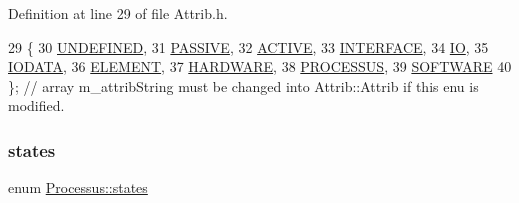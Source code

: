 Definition at line 29 of file Attrib.\+h.


\begin{DoxyCode}
29                 \{
30     \hyperlink{classAttrib_a69e171d7cc6417835a5a306d3c764235a3a8da2ab97dda18aebab196fe4100531}{UNDEFINED},
31     \hyperlink{classAttrib_a69e171d7cc6417835a5a306d3c764235a2bfb2af57b87031d190a05fe25dd92ed}{PASSIVE},
32     \hyperlink{classAttrib_a69e171d7cc6417835a5a306d3c764235a3b1fec929c0370d1436f2f06e298fb0d}{ACTIVE},
33     \hyperlink{classAttrib_a69e171d7cc6417835a5a306d3c764235aa27c16b480a369ea4d18b07b2516bbc7}{INTERFACE},
34     \hyperlink{classAttrib_a69e171d7cc6417835a5a306d3c764235a1420a5b8c0540b2af210b6975eded7f9}{IO},
35     \hyperlink{classAttrib_a69e171d7cc6417835a5a306d3c764235a0af3b0d0ac323c1704e6c69cf90add28}{IODATA},
36     \hyperlink{classAttrib_a69e171d7cc6417835a5a306d3c764235a7788bc5dd333fd8ce18562b269c9dab1}{ELEMENT},
37     \hyperlink{classAttrib_a69e171d7cc6417835a5a306d3c764235a61ceb22149f365f1780d18f9d1459423}{HARDWARE},
38     \hyperlink{classAttrib_a69e171d7cc6417835a5a306d3c764235a75250e29692496e73effca2c0330977f}{PROCESSUS},
39     \hyperlink{classAttrib_a69e171d7cc6417835a5a306d3c764235a103a67cd0b8f07ef478fa45d4356e27b}{SOFTWARE} 
40   \}; \textcolor{comment}{// array m\_attribString must be changed into Attrib::Attrib if this enu is modified. }
\end{DoxyCode}
\mbox{\label{classProcessus_a36278773bd98f2d5612fea40c7774821}} 
\subsubsection{\texorpdfstring{states}{states}}
{\footnotesize\ttfamily enum \hyperlink{classProcessus_a36278773bd98f2d5612fea40c7774821}{Processus\+::states}\hspace{0.3cm}{\ttfamily [inherited]}}

